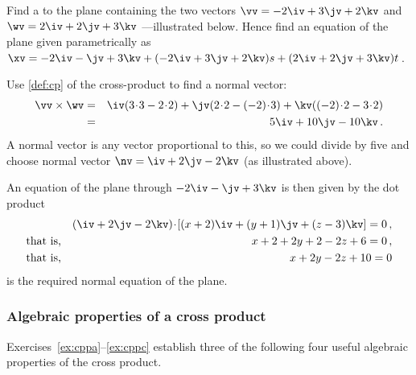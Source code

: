\begin{example} \label{eg:cpnvp}
Find a  to the plane containing the two vectors \(\vv=-2\iv+3\jv+2\kv\) and \(\wv=2\iv+2\jv+3\kv\) ---illustrated below.
Hence find an equation of the plane given parametrically as \(\xv=-2\iv-\jv+3\kv+(-2\iv+3\jv+2\kv)s+(2\iv+2\jv+3\kv)t\)\,.
\begin{center}
\end{center}
\begin{solution} 
Use \autoref{def:cp} of the cross-product to find a normal vector:
\begin{eqnarray*}
\vv\times\wv&=&
\iv(3\cdot 3-2\cdot 2)
+\jv(2\cdot 2-(-2)\cdot 3)
+\kv((-2)\cdot 2-3\cdot 2)
\\&=&5\iv+10\jv-10\kv\,.
\end{eqnarray*}
A normal vector is any vector proportional to this, so we could divide by five and choose normal vector \(\nv=\iv+2\jv-2\kv\) (as illustrated above).

An equation of the plane through \(-2\iv-\jv+3\kv\) is then given by the dot product
\begin{eqnarray*}
&&(\iv+2\jv-2\kv)\cdot[(x+2)\iv+(y+1)\jv+(z-3)\kv]=0\,,
\\\text{that is,}&& x+2+2y+2-2z+6=0\,,
\\\text{that is,}&& x+2y-2z+10=0
\end{eqnarray*}
is the required normal equation of the plane.
\end{solution}
\end{example}




\subsubsection{Algebraic properties of a cross product}

Exercises~\ref{ex:cppa}--\ref{ex:cppc} establish three of the following four useful algebraic properties of the cross product.

